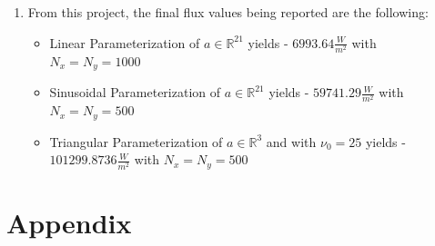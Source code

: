 \documentclass{article}
\begin{document}
\begin{enumerate}
\item From this project, the final flux values being reported are the following: \\
\begin{itemize}
\item Linear Parameterization of $a \in \mathbb{R}^{21}$ yields - $6993.64 \frac{W}{m^2}$ with $N_x = N_y = 1000$
\item Sinusoidal Parameterization of $a \in \mathbb{R}^{21}$ yields - $59741.29 \frac{W}{m^2}$ with $N_x = N_y = 500$
\item Triangular Parameterization of $a \in \mathbb{R}^3$ and with $\nu_0 = 25$ yields - $101299.8736 \frac{W}{m^2}$ with $N_x = N_y = 500$
\end{itemize}
\end{enumerate}
\newpage
\section{Appendix}
\end{document}
